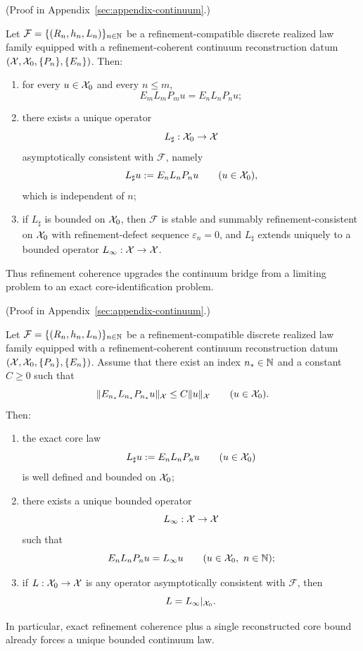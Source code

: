 (Proof in Appendix~\ref{sec:appendix-continuum}.)

\begin{theorem}
\label{thm:refinement-coherent-core-realization}
Let \(\mathcal F=\{(R_n,h_n,L_n)\}_{n\in\mathbb{N}}\) be a refinement-compatible
discrete realized law family equipped with a refinement-coherent continuum
reconstruction datum \((\mathcal{X},\mathcal{X}_0,\{P_n\},\{E_n\})\). Then:
\begin{enumerate}[label=(\roman*), leftmargin=2em, itemsep=0.2em]
\item for every \(u\in\mathcal{X}_0\) and every \(n\le m\),
      \[
      E_mL_mP_mu = E_nL_nP_nu;
      \]
\item there exists a unique operator
      \[
      L_\sharp:\mathcal{X}_0\to\mathcal{X}
      \]
      asymptotically consistent with \(\mathcal F\), namely
      \[
      L_\sharp u := E_nL_nP_nu
      \qquad (u\in\mathcal{X}_0),
      \]
      which is independent of \(n\);
\item if \(L_\sharp\) is bounded on \(\mathcal{X}_0\), then \(\mathcal F\) is stable
      and summably refinement-consistent on \(\mathcal{X}_0\) with refinement-defect
      sequence \(\varepsilon_n=0\), and \(L_\sharp\) extends uniquely to a
      bounded operator \(L_\infty:\mathcal{X}\to\mathcal{X}\).
\end{enumerate}
Thus refinement coherence upgrades the continuum bridge from a limiting problem
to an exact core-identification problem.
\end{theorem}

(Proof in Appendix~\ref{sec:appendix-continuum}.)

\begin{theorem}
\label{thm:one-stage-bounded-exact-core-forcing}
Let \(\mathcal F=\{(R_n,h_n,L_n)\}_{n\in\mathbb{N}}\) be a refinement-compatible
discrete realized law family equipped with a refinement-coherent continuum
reconstruction datum \((\mathcal{X},\mathcal{X}_0,\{P_n\},\{E_n\})\). Assume that there exist
an index \(n_\ast\in\mathbb{N}\) and a constant \(C\ge 0\) such that
\[
\|E_{n_\ast}L_{n_\ast}P_{n_\ast}u\|_{\mathcal{X}}
\le
C\|u\|_{\mathcal{X}}
\qquad (u\in\mathcal{X}_0).
\]
Then:
\begin{enumerate}[label=(\roman*), leftmargin=2em, itemsep=0.2em]
\item the exact core law
      \[
      L_\sharp u:=E_nL_nP_nu
      \qquad (u\in\mathcal{X}_0)
      \]
      is well defined and bounded on \(\mathcal{X}_0\);
\item there exists a unique bounded operator
      \[
      L_\infty:\mathcal{X}\to\mathcal{X}
      \]
      such that
      \[
      E_nL_nP_nu=L_\infty u
      \qquad (u\in\mathcal{X}_0,\ n\in\mathbb{N});
      \]
\item if \(L:\mathcal{X}_0\to\mathcal{X}\) is any operator asymptotically consistent with
      \(\mathcal F\), then
      \[
      L=L_\infty|_{\mathcal{X}_0}.
      \]
\end{enumerate}
In particular, exact refinement coherence plus a single reconstructed core
bound already forces a unique bounded continuum law.
\end{theorem}

